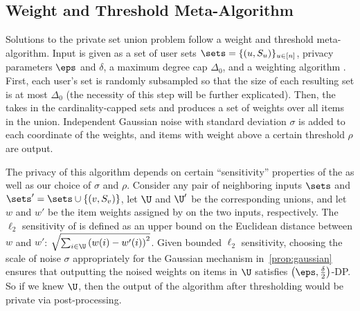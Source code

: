 \subsection{Weight and Threshold Meta-Algorithm}



Solutions to the private set union problem follow a weight and threshold meta-algorithm. Input is given as a set of user sets $\sets=\{(u, S_u)\}_{u \in [n]}$, privacy parameters $\eps$ and $\delta$, a maximum degree cap $\Delta_0$, and a weighting algorithm \weightalgo.
First, each user's set is randomly subsampled so that the size of each resulting set is at most $\Delta_0$ (the necessity of this step will be further explicated).
Then, the \weightalgo{} takes in the cardinality-capped sets and produces a set of weights over all items in the union.
Independent Gaussian noise with standard deviation $\sigma$ is added to each coordinate of the weights, and items with weight above a certain threshold $\rho$ are output.

The privacy of this algorithm depends on certain ``sensitivity'' properties of the \weightalgo{} as well as our choice of $\sigma$ and $\rho$. Consider any pair of neighboring inputs $\sets$ and $\sets' = \sets \cup \{(v, S_v)\}$, let $\U$ and $\U'$ be the corresponding unions, and let $w$ and $w'$ be the item weights assigned by \weightalgo{} on the two inputs, respectively. The $\ell_2$ sensitivity of \weightalgo{} is defined as an upper bound on the Euclidean distance between $w$ and $w'$: $\sqrt{\sum_{i \in \U} \left(w(i) - w'(i)\right)^2}$.
Given bounded $\ell_2$ sensitivity, choosing the scale of noise $\sigma$ appropriately for the Gaussian mechanism in~\cref{prop:gaussian} ensures that outputting the noised weights on items in $\U$ satisfies $\left(\eps, \frac{\delta}{2} \right)$-DP.
So if we knew $\U$, then the output of the algorithm after thresholding would be private via post-processing.

